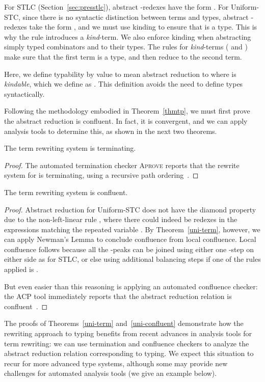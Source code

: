 \documentclass{LMCS}
\begin{document}
For STLC (Section~\ref{sec:presstlc}), abstract -redexes have the
form .  For Uniform-STC, since there is no syntactic
distinction between terms and types, abstract -redexes take the
form , and we must use kinding to ensure that 
is a type.  This is why the  rule introduces a
\textit{kind}-term.  We also enforce kinding when abstracting simply
typed combinators  and  to their types.  The rules for \textit{kind}-terms
( and ) make sure that the first
term is a type, and then reduce to the second term.

Here, we define typability by value  to mean abstract reduction to
 where  is \emph{kindable}, which we define as
.  This definition avoids the need to
define types syntactically.

Following the methodology embodied in Theorem~\ref{thmtp}, we must
first prove the abstract reduction is confluent.  In fact, it is
convergent, and we can apply analysis tools to determine this, as
shown in the next two theorems.

\begin{thm}
  \label{uni-term}
  The term rewriting system  is terminating.
\end{thm}

\begin{proof}
The automated termination checker \textsc{Aprove} reports that the
rewrite system for  is terminating, using a recursive path
ordering~\cite{aprove}.
\end{proof}

\begin{thm}
\label{uni-confluent}
  The term rewriting system   is confluent.
\end{thm}
\begin{proof}
Abstract reduction for Uniform-STC does not have the diamond property
due to the non-left-linear rule , where there could indeed
be redexes in the expressions matching the repeated variable .
By Theorem~\ref{uni-term}, however, we can apply Newman's Lemma to
conclude confluence from local confluence.  Local confluence follows
because all the -peaks can be joined using either one -step on
either side as for STLC, or else using additional balancing steps if
one of the rules applied is .  

But even easier than this reasoning is applying an automated
confluence checker: the ACP tool immediately reports that the abstract
reduction relation is confluent~\cite{aoto+09}.
\end{proof}

The proofs of Theorems~\ref{uni-term} and~\ref{uni-confluent}
demonstrate how the rewriting approach to typing benefits from recent
advances in analysis tools for term rewriting: we can use termination
and confluence checkers to analyze the abstract reduction relation
 corresponding to typing.  We expect this situation to recur
for more advanced type systems, although some may provide new
challenges for automated analysis tools (we give an example below).
\end{document}
